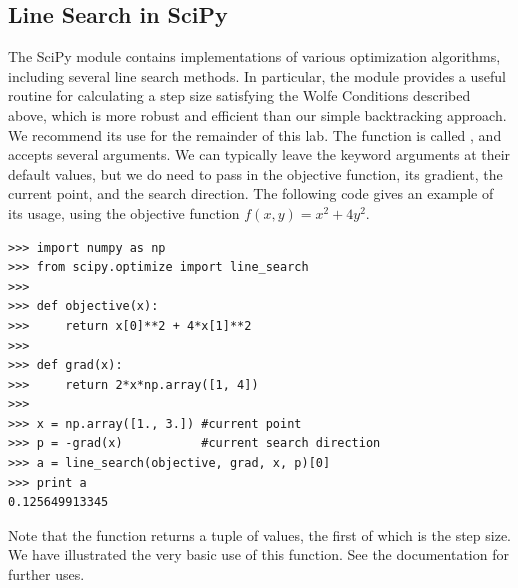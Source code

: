 \subsection*{Line Search in SciPy}
The SciPy module  contains implementations of various optimization algorithms,
including several line search methods. In particular, the module provides a useful routine for
calculating a step size satisfying the Wolfe Conditions described above, which is more robust
and efficient than our simple backtracking approach. We recommend its use for the remainder of
this lab. The function is called , and accepts several arguments. We can typically
leave the keyword arguments at their default values, but we do need to pass in the objective
function, its gradient, the current point, and the search direction. The following code gives
an example of its usage, using the objective function $f(x, y) = x^2+4y^2$.
\begin{lstlisting}
>>> import numpy as np
>>> from scipy.optimize import line_search
>>>
>>> def objective(x):
>>>     return x[0]**2 + 4*x[1]**2
>>>
>>> def grad(x):
>>>     return 2*x*np.array([1, 4])
>>>
>>> x = np.array([1., 3.]) #current point
>>> p = -grad(x)           #current search direction
>>> a = line_search(objective, grad, x, p)[0]
>>> print a
0.125649913345
\end{lstlisting}
Note that the function returns a tuple of values, the first of which is the step size. We have illustrated
the very basic use of this function. See the documentation for further uses.
